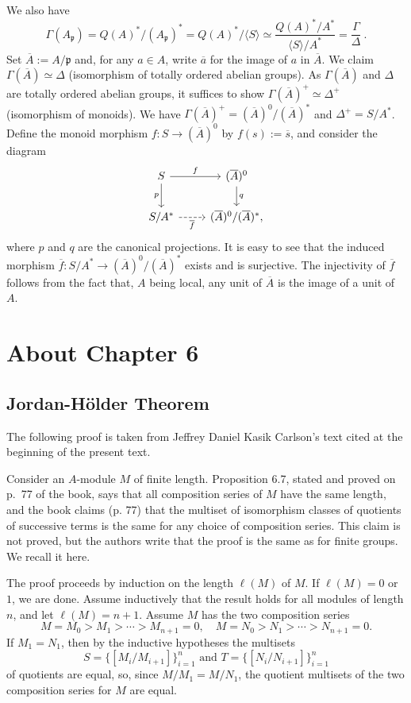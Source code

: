\documentclass[parskip=half,fontsize=12pt]{scrartcl}%
\newcommand{\mf}{\mathfrak}
\newcommand{\ppp}{\mf p}
\begin{document}
We also have 
$$
\Gamma(A_\ppp)=Q(A)^*/(A_\ppp)^*=Q(A)^*/\langle S\rangle\simeq\frac{Q(A)^*/A^*}{\langle S\rangle/A^*}=\frac{\Gamma}{\Delta}\ .
$$ 
Set $\overline A:=A/\ppp$ and, for any $a\in A$, write $\overline a$ for the image of $a$ in $\overline A$. We claim $\Gamma(\overline A)\simeq\Delta$ (isomorphism of totally ordered abelian groups). As $\Gamma(\overline A)$ and $\Delta$ are totally ordered abelian groups, it suffices to show $\Gamma(\overline A)^+\simeq\Delta^+$ (isomorphism of monoids). We have $\Gamma(\overline A)^+=(\overline A)^0/(\overline A)^*$ and $\Delta^+=S/A^*$. Define the monoid morphism $f:S\to(\overline A)^0$ by $f(s):=\overline s$, and consider the diagram 
$$
\begin{tikzcd}
S\ar[r,"f"]\ar[d,"p"']&(\overline A)^0\ar[d,"q"]\\ 
S/A^*\ar[r,dashrightarrow,"\overline f"']&(\overline A)^0/(\overline A)^*,
\end{tikzcd}
$$ 
where $p$ and $q$ are the canonical projections. It is easy to see that the induced morphism $\overline f:S/A^*\to(\overline A)^0/(\overline A)^*$ exists and is surjective. The injectivity of $\overline f$ follows from the fact that, $A$ being local, any unit of $\overline A$ is the image of a unit of $A$.

\section{About Chapter 6}%

\subsection{Jordan-Hölder Theorem}%

The following proof is taken from Jeffrey Daniel Kasik Carlson's text cited at the beginning of the present text. 

Consider an $A$-module $M$ of finite length. Proposition 6.7, stated and proved on p.~77 of the book, says that all composition series of $M$ have the same length, and the book claims (p. 77) that the multiset of isomorphism classes of quotients of successive terms is the same for any choice of composition series. This claim is not proved, but the authors write that the proof is the same as for finite groups. We recall it here.

The proof proceeds by induction on the length $\ell(M)$ of $M$. If $\ell(M)=0$ or $1$, we are done. Assume inductively that the result holds for all modules of length $n$, and let $\ell(M)=n+1$. Assume $M$ has the two composition series 
$$
M=M_0>M_1>\cdots>M_{n+1}=0,\quad M=N_0>N_1>\cdots>N_{n+1}=0.
$$
If $M_1=N_1$, then by the inductive hypotheses the multisets 
$$
S=\{[M_i/M_{i+1}]\}_{i=1}^n\text{ and }T=\{[N_i/N_{i+1}]\}_{i=1}^n
$$ 
of quotients are equal, so, since $M/M_1=M/N_1$, the quotient multisets of the two composition series for $M$ are equal.
\end{document}
